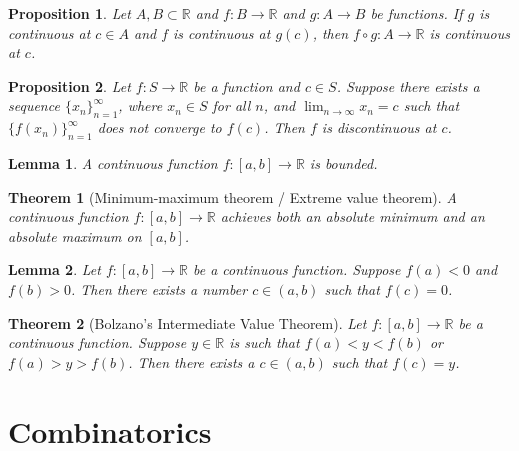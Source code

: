 \documentclass{article}
\newtheorem{theorem}{Theorem}[section]
\newtheorem{lemma}{Lemma}[section]
\newtheorem{proposition}{Proposition}[section]
\theoremstyle{definition}
\theoremstyle{remark}
\begin{document}
\begin{proposition}
Let $A, B \subset \mathbb{R}$ and $f : B \to \mathbb{R}$ and $g : A \to B$ be functions. If $g$ is continuous at $c \in A$ and $f$ is continuous at $g(c)$, then $f \circ g: A \to \mathbb{R}$ is continuous at $c$.
\end{proposition}

\begin{proposition}
Let $f : S \to \mathbb{R}$ be a function and $c \in S$. Suppose there exists a sequence $\{x_n\}_{n=1}^{\infty}$, where $x_n \in S$ for all $n$, and $\lim_{n\to\infty} x_n = c$ such that $\{f(x_n)\}_{n=1}^{\infty}$ does not converge to $f(c)$. Then $f$ is discontinuous at $c$.
\end{proposition}

\begin{lemma}
A continuous function $f : [a,b] \to \mathbb{R}$ is bounded.
\end{lemma}

\begin{theorem}[Minimum-maximum theorem / Extreme value theorem]
A continuous function $f : [a,b] \to \mathbb{R}$ achieves both an absolute minimum and an absolute maximum on $[a,b]$.
\end{theorem}

\begin{lemma}
Let $f : [a,b] \to \mathbb{R}$ be a continuous function. Suppose $f(a) < 0$ and $f(b) > 0$. Then there exists a number $c \in (a,b)$ such that $f(c) = 0$.
\end{lemma}

\begin{theorem}[Bolzano's Intermediate Value Theorem]
Let $f : [a,b] \to \mathbb{R}$ be a continuous function. Suppose $y \in \mathbb{R}$ is such that $f(a) < y < f(b)$ or $f(a) > y > f(b)$. Then there exists a $c \in (a,b)$ such that $f(c) = y$.
\end{theorem}



















\section{Combinatorics}
\end{document}
